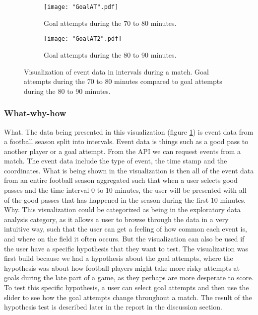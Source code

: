 \documentclass[Report.tex]{subfiles}
\begin{document}
\begin{figure}
\center
\begin{subfigure}[b]{0.7\linewidth}
\texttt{[image: "GoalAT".pdf]}
\caption{Goal attempts during the 70 to 80 minutes.}
\end{subfigure}
\begin{subfigure}[b]{0.7\textwidth}
\texttt{[image: "GoalAT2".pdf]}
\caption{Goal attempts during the 80 to 90 minutes.}
\end{subfigure}
\caption{Visualization of event data in intervals during a match. Goal attempts during the 70 to 80 minutes compared to goal attempts during the 80 to 90 minutes.}

\label{Fig:Events}
\end{figure}

\subsubsection{What-why-how}
What. The data being presented in this visualization (figure \ref{Fig:Events}) is event data from a football season split into intervals. Event data is things such as a good pass to another player or a goal attempt. From the API we can request events from a match. The event data include the type of event, the time stamp and the coordinates. What is being shown in the visualization is then all of the event data from an entire football season aggregated such that when a user selects good passes and the time interval 0 to 10 minutes, the user will be presented with all of the good passes that has happened in the season during the first 10 minutes.\\

\noindent Why. This visualization could be categorized as being in the exploratory data analysis category, as it allows a user to browse through the data in a very intuitive way, such that the user can get a feeling of how common each event is, and where on the field it often occurs. But the visualization can also be used if the user have a specific hypothesis that they want to test. The visualization was first build because we had a hypothesis about the goal attempts, where the hypothesis was about how football players might take more risky attempts at goals during the late part of a game, as they perhaps are more desperate to score. To test this specific hypothesis, a user can select goal attempts and then use the slider to see how the goal attempts change throughout a match. The result of the hypothesis test is described later in the report in the discussion section.\\
\end{document}

